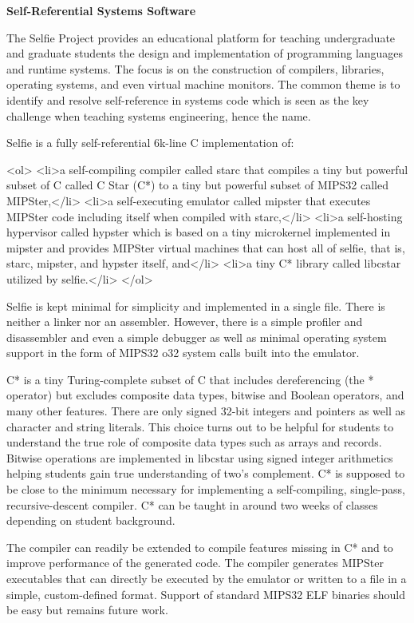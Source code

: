 {\bf{Self-Referential Systems Software}}

The Selfie Project provides an educational platform for teaching undergraduate and graduate students the design and implementation of programming languages and runtime systems. The focus is on the construction of compilers, libraries, operating systems, and even virtual machine monitors. The common theme is to identify and resolve self-reference in systems code which is seen as the key challenge when teaching systems engineering, hence the name.

Selfie is a fully self-referential 6k-line C implementation of:

<ol>
<li>a self-compiling compiler called starc that compiles a tiny but powerful subset of C called C Star (C*) to a tiny but powerful subset of MIPS32 called MIPSter,</li>
<li>a self-executing emulator called mipster that executes MIPSter code including itself when compiled with starc,</li>
<li>a self-hosting hypervisor called hypster which is based on a tiny microkernel implemented in mipster and provides MIPSter virtual machines that can host all of selfie, that is, starc, mipster, and hypster itself, and</li>
<li>a tiny C* library called libcstar utilized by selfie.</li>
</ol>

Selfie is kept minimal for simplicity and implemented in a single file. There is neither a linker nor an assembler. However, there is a simple profiler and disassembler and even a simple debugger as well as minimal operating system support in the form of MIPS32 o32 system calls built into the emulator.

C* is a tiny Turing-complete subset of C that includes dereferencing (the * operator) but excludes composite data types, bitwise and Boolean operators, and many other features. There are only signed 32-bit integers and pointers as well as character and string literals. This choice turns out to be helpful for students to understand the true role of composite data types such as arrays and records. Bitwise operations are implemented in libcstar using signed integer arithmetics helping students gain true understanding of two's complement. C* is supposed to be close to the minimum necessary for implementing a self-compiling, single-pass, recursive-descent compiler. C* can be taught in around two weeks of classes depending on student background.

The compiler can readily be extended to compile features missing in C* and to improve performance of the generated code. The compiler generates MIPSter executables that can directly be executed by the emulator or written to a file in a simple, custom-defined format. Support of standard MIPS32 ELF binaries should be easy but remains future work.

